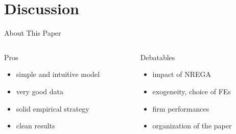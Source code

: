 \section{Discussion}

 \frame{\sectionpage}

\begin{frame}{About This Paper}

    \begin{columns}[T]
        \begin{column}{0.45\textwidth}
            \begin{block}{Pros}
                \begin{itemize}
                    \item simple and intuitive model
                    \item very good data
                    \item solid empirical strategy 
                    \item clean results
                \end{itemize}
            \end{block}
        \end{column}

        \begin{column}{0.45\textwidth}
            \begin{block}{Debatables}
                \begin{itemize}
                    \item impact of NREGA
                    \item exogeneity, choice of FEs
                    \item firm performances
                    \item organization of the paper
                \end{itemize}
            \end{block}
        \end{column}
    \end{columns}
\end{frame}

